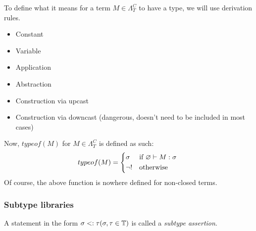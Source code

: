 \documentclass[main.tex]{subfiles}
\begin{document}
\begin{defn}
    To define what it means for a term $M \in \Lambda_T^C$ to have a type,
    we will use derivation rules.
    \begin{itemize}
        \item Constant
        \item Variable
        \item Application
        \item Abstraction
        \item Construction via upcast
        \item Construction via downcast (dangerous, doesn't need to be included in most cases)
    \end{itemize}

    Now, $typeof(M)$ for $M \in \Lambda_T^C$ is defined as such:
    \[
        typeof(M) =
        \begin{cases*}
            \sigma & if $\varnothing \vdash M : \sigma$ \\
            \neg ! & otherwise
        \end{cases*}
    \]
    Of course, the above function is nowhere defined for non-closed terms.
\end{defn}

\pagebreak
\subsubsection{Subtype libraries}
\begin{defn}
    A statement in the form $\sigma <: \tau (\sigma, \tau \in \mathbb{T})$
    is called a \emph{subtype assertion}.
\end{defn}
\end{document}
